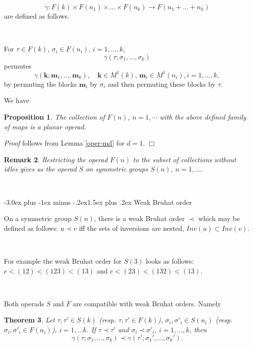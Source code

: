 \documentclass[12pt,a4paper]{article}
\makeatletter
\newtheorem{theorem}{Theorem}[section]
\newtheorem{prop}[theorem]{Proposition}
\newtheorem{remark}[theorem]{Remark}
\renewcommand{\subsection}{\@startsection{subsection}{2}{0pt}%
{-3.0ex plus -1ex minus -.2ex}{-1.5ex plus .2ex}%
{\normalfont\large\bf}}
\renewcommand{\subsection}{\@startsection{subsection}{2}{0pt}%
{-3.0ex plus -1ex minus -.2ex}{1.5ex plus .2ex}%
{\normalfont\large\bf}}
\renewcommand{\subsection}{\@startsection{subsection}{2}{0pt}%
{-3.0ex plus -1ex minus -.2ex}{-1.5ex plus .2ex}%
{\normalfont\normalsize\bf}}
\renewcommand{\subsection}{\@startsection{subsection}{2}{0pt}%
{-3.0ex plus -1ex minus -.2ex}{1.5ex plus .2ex}%
{\normalfont\normalsize\bf}}
\makeatother
\begin{document}
 \[
 \gamma: F(k)\times F(n_1)\times \ldots \times F(n_k)\to F(n_1+\ldots +n_k)\]
 are defined as follows.
 
 \
 
 For $\tau\in F(k)$, $\sigma_i\in F(n_i)$, $i=1, \ldots, k$,
 \[
 \gamma(\tau; \sigma_1, \ldots , \sigma_k)
 \]
 permutes 
 \[
 \gamma(\mathbf k; \mathbf m_1, \ldots, \mathbf m_k), \quad \mathbf k\in M^1(k), \, \mathbf m_i\in M^1(n_i), i=1, \ldots, k,
 \]
 by permuting the blocks $\mathbf m_i$  by $\sigma_i$ and then permuting these blocks by $\tau$.
 
 We have 
 \begin{prop}
 The collection of $F(n)$, $n=1, \cdots$ with the above defined family of maps is a planar operad.
 \end{prop}

 {\em Proof} follows from  Lemma \ref{oper-md} for $d = 1$.
 \hfill $\Box$

\begin{remark}
Restricting the operad $F(n)$ to the subset of collections without idles gives us the operad $S$ on symmetric groups $S(n)$, $n=1, \ldots$.
\end{remark}

\


  \subsection{Weak Bruhat order}
  
On a symmetric group $S(n)$, there is  a weak Bruhat order $\prec$ which may be defined as follows: 
$u\prec v$ iff the sets of inversions are nested, $Inv(u)\subset Inv(v)$.

\

For example the weak Bruhat order for $S(3)$ looks as follows: 
\newline $e < (12) < (123) < (13)$ and 
$e < (23) < (132) < (13)$.

\ 

 Both operads $S$ and $F$ are compatible with weak Bruhat orders. Namely
 
\begin{theorem}\label{order-1}
 Let $\tau, \tau'\in S(k)$ (resp. $\tau, \tau'\in F(k)$), $\sigma_i, \sigma'_i\in S(n_i)$ 
 (resp. $\sigma_i, \sigma'_i\in F(n_i)$), $i=1, \ldots k$. If $\tau\prec\tau'$ and  
$\sigma_i\prec\sigma'_i$, $i=1, \ldots, k$, then
  \[
 \gamma(\tau; \sigma_1,\ldots , \sigma_k)\prec 
 \gamma(\tau'; \sigma_1',\ldots,  \sigma_k').
 \]
\end{theorem}
\end{document}

